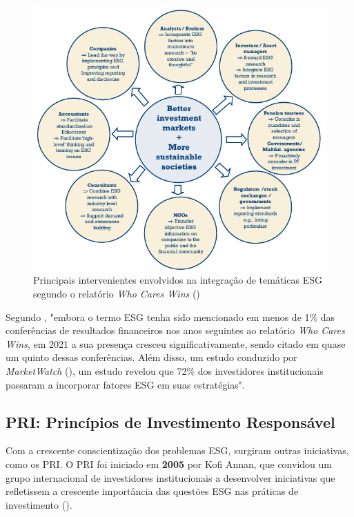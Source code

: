 \begin{figure}[htbp]
    \centering
    \includegraphics[width=5in,keepaspectratio]{frontmatter/assets/agentes-chave-esg-wcw.png}
    \caption{Principais intervenientes envolvidos na integração de temáticas ESG segundo o relatório \textit{Who Cares Wins} (\cite{onValues2005})}
    \label{fig:wcwactors}
\end{figure}

Segundo \cite{Pollman2024}, "embora o termo ESG tenha sido mencionado em menos de 1\% das conferências de resultados financeiros nos anos seguintes ao relatório \textit{Who Cares Wins}, em 2021 a sua presença cresceu significativamente, sendo citado em quase um quinto dessas conferências. Além disso, um estudo conduzido por \textit{MarketWatch} (\cite{Carlson2021}), um estudo revelou que 72\% dos investidores institucionais passaram a incorporar fatores ESG em suas estratégias".

\subsection{PRI: Princípios de Investimento Responsável}
\label{subsec: PRI}

Com a crescente conscientização dos problemas ESG, surgiram outras iniciativas, como os \gls{PRI}. O PRI foi iniciado em \textbf{2005} por Kofi Annan, que convidou um grupo internacional de investidores institucionais a desenvolver iniciativas que refletissem a crescente importância das questões ESG nas práticas de investimento (\cite{Kim2022}).

